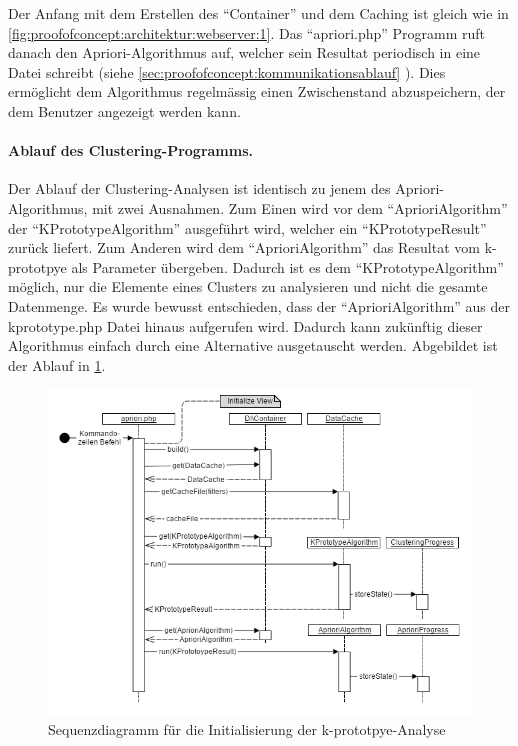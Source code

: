 Der Anfang mit dem Erstellen des "`Container"' und dem Caching ist gleich wie in \cref{fig:proofofconcept:architektur:webserver:1}. Das "`apriori.php"' Programm ruft danach den Apriori-Algorithmus auf, welcher sein Resultat periodisch in eine Datei schreibt (siehe \cref{sec:proofofconcept:kommunikationsablauf} ). Dies ermöglicht dem Algorithmus regelmässig einen Zwischenstand abzuspeichern, der dem Benutzer angezeigt werden kann.

\paragraph{Ablauf des Clustering-Programms.}
Der Ablauf der Clustering-Analysen ist identisch zu jenem des Apriori-Algorithmus, mit zwei Ausnahmen. Zum Einen wird vor dem "`AprioriAlgorithm"' der "`KPrototypeAlgorithm"' ausgeführt wird, welcher ein "`KPrototypeResult"' zurück liefert. 
Zum Anderen wird dem "`AprioriAlgorithm"' das Resultat vom k-prototpye als Parameter übergeben. Dadurch ist es dem "`KPrototypeAlgorithm"' möglich, nur die Elemente eines Clusters zu analysieren und nicht die gesamte Datenmenge. 
Es wurde bewusst entschieden, dass der "`AprioriAlgorithm"' aus der kprototype.php Datei hinaus aufgerufen wird. Dadurch kann zukünftig dieser Algorithmus einfach durch eine Alternative ausgetauscht werden.
Abgebildet ist der Ablauf in \cref{fig:proofofconcept:architektur:hintergrundprozesser:2}. 
\begin{figure}[H]
	\centering
	\includegraphics[width=1\textwidth]{images/diagram-sequence-kprototype}
	\caption{Sequenzdiagramm für die Initialisierung der k-prototpye-Analyse}
	\label{fig:proofofconcept:architektur:hintergrundprozesser:2}
\end{figure}

